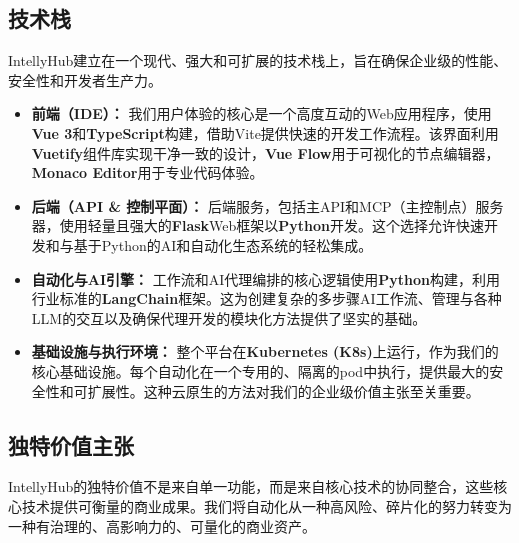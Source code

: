 \documentclass[11pt, a4paper, oneside]{article}
\begin{document}
\pagebreak
\subsection{技术栈}
IntellyHub建立在一个现代、强大和可扩展的技术栈上，旨在确保企业级的性能、安全性和开发者生产力。

\begin{itemize}
\item \textbf{前端（IDE）：} 我们用户体验的核心是一个高度互动的Web应用程序，使用\textbf{Vue 3}和\textbf{TypeScript}构建，借助Vite提供快速的开发工作流程。该界面利用\textbf{Vuetify}组件库实现干净一致的设计，\textbf{Vue Flow}用于可视化的节点编辑器，\textbf{Monaco Editor}用于专业代码体验。

\item \textbf{后端（API \& 控制平面）：} 后端服务，包括主API和MCP（主控制点）服务器，使用轻量且强大的\textbf{Flask}Web框架以\textbf{Python}开发。这个选择允许快速开发和与基于Python的AI和自动化生态系统的轻松集成。

\item \textbf{自动化与AI引擎：} 工作流和AI代理编排的核心逻辑使用\textbf{Python}构建，利用行业标准的\textbf{LangChain}框架。这为创建复杂的多步骤AI工作流、管理与各种LLM的交互以及确保代理开发的模块化方法提供了坚实的基础。

\item \textbf{基础设施与执行环境：} 整个平台在\textbf{Kubernetes (K8s)}上运行，作为我们的核心基础设施。每个自动化在一个专用的、隔离的pod中执行，提供最大的安全性和可扩展性。这种云原生的方法对我们的企业级价值主张至关重要。
\end{itemize}

\subsection{独特价值主张}
IntellyHub的独特价值不是来自单一功能，而是来自核心技术的协同整合，这些核心技术提供可衡量的商业成果。我们将自动化从一种高风险、碎片化的努力转变为一种有治理的、高影响力的、可量化的商业资产。
\end{document}
